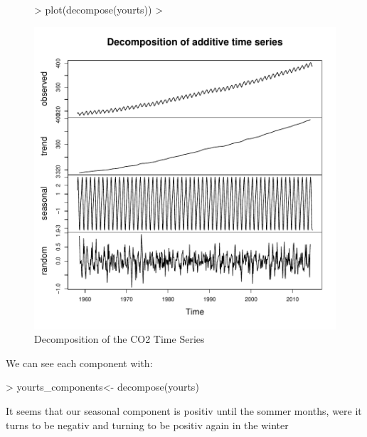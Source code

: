 \documentclass[11pt, a4paper]{article} %
\begin{document}
\begin{figure}[H]
\centering
\begin{Schunk}
\begin{Sinput}
> plot(decompose(yourts)) 
> 
\end{Sinput}
\end{Schunk}
\includegraphics{sweaveclean-decompose}
\caption{Decomposition of the CO2 Time Series}
\end{figure}


\noindent We can see each component with:
\begin{Schunk}
\begin{Sinput}
> yourts_components<- decompose(yourts)
\end{Sinput}
\end{Schunk}
\begin{Schunk}
\end{Schunk}

It seems that our seasonal component is positiv until the sommer months, were it turns to be negativ and turning to be positiv again in the winter
\end{document}
